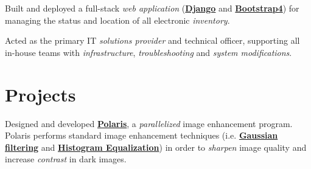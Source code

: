 \documentclass[]{openfont}
\begin{document}
\begin{minipage}[t]{0.65\textwidth}
    \begin{tightemize}
        \item Built and deployed a full-stack \textit{web application} (\href{https://www.djangoproject.com/}{\textbf{Django}} and \href{https://getbootstrap.com/}{\textbf{Bootstrap4}}) for managing the status and location of all electronic \textit{inventory}.
        \item Acted as the primary IT \textit{solutions provider} and technical officer, supporting all in-house teams with \textit{infrastructure}, \textit{troubleshooting} and \textit{system modifications}.
    \end{tightemize}
    \sectionsep


    \section{Projects}
    \begin{tightemize}
        \item Designed and developed \textbf{\href{https://github.com/OwaisK4/Parallel_Image_Enhancement}{Polaris}}, a \textit{parallelized} image enhancement program. Polaris performs standard image enhancement techniques (i.e. \href{https://en.wikipedia.org/wiki/Gaussian_filter}{\textbf{Gaussian filtering}} and \href{https://en.wikipedia.org/wiki/Histogram_equalization}{\textbf{Histogram Equalization}}) in order to \textit{sharpen} image quality and increase \textit{contrast} in dark images.\\
    \end{tightemize}
    \sectionsep


\end{minipage}
\end{document}

